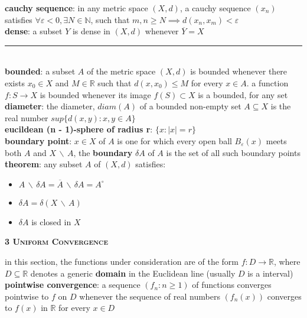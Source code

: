 \documentclass[a4paper]{article}
\newcommand*\closure[1]{\overline{#1}}
\newcommand*\interior[1]{{#1}^\circ}
\newcommand*\abs[1]{\vert #1 \vert}
\newcommand*\setremove[2]{#1 \, \backslash \, #2}
\newcommand*\linesep[0]{\noindent\rule{\textwidth}{0.5pt}\\}
\begin{document}
\begin{multicols}{2}
\begin{framed}
	\noindent
	\textbf{cauchy sequence}: in any metric space $(X, d)$, a cauchy sequence $(x_n)$ satisfies $\forall \varepsilon < 0, \exists N \in \mathbb{N}$, such that $m, n \geq N \implies d(x_n, x_m) < \varepsilon$\\
	
	\noindent
	\textbf{dense}: a subset $Y$ is dense in $(X, d)$ whenever $\closure{Y} = X$
	
	\linesep
	\textbf{bounded}: a subset $A$ of the metric space $(X,d)$ is bounded whenever there exists $x_0 \in X$ and $M \in \mathbb{R}$ such that $d(x, x_0) \leq M$ for every $x \in A$. a function $f: S \rightarrow X$ is bounded whenever its image $f(S) \subset X$ is a bounded, for any set\\
	
	\noindent
	\textbf{diameter}: the diameter, $diam(A)$ of a bounded non-empty set $A \subseteq X$ is the real number $sup\{d(x, y) : x, y \in A\}$\\
	
	\noindent
	\textbf{eucildean (n - 1)-sphere of radius r}: $\{x : \abs{x} = r\}$\\
	
	\noindent
	\textbf{boundary point}: $x \in X$ of $A$ is one for which every open ball $B_\varepsilon(x)$ meets both $A$ and $\setremove{X}{A}$, the \textbf{boundary} $\delta A$ of $A$ is the set of all such boundary points\\
	
	\noindent
	\textbf{theorem}: any subset $A$ of $(X, d)$ satisfies:
		\begin{itemize}
			\item $\setremove{A}{\delta A} = \setremove{\closure{A}}{\delta A} = \interior{A}$
			\item $\delta A = \delta(\setremove{X}{A})$
			\item $\delta A$ is closed in $X$
		\end{itemize}	
\end{framed}

\newpage
\begin{framed}
	\begin{center}
		\textbf{\textsc{3 Uniform Convergence}}
	\end{center}
	in this section, the functions under consideration are of the form $f: D \rightarrow \mathbb{R}$, where $D \subseteq \mathbb{R}$ denotes a generic \textbf{domain} in the Euclidean line (usually $D$ is a interval)\\
	
	\noindent
	\textbf{pointwise convergence}: a sequence $(f_n : n \geq 1)$ of functions converges pointwise to $f$ on $D$ whenever the sequence of real numbers $(f_n(x))$ converges to $f(x)$ in $\mathbb{R}$ for every $x \in D$\\
	

\end{framed}
\end{multicols}
\end{document}
